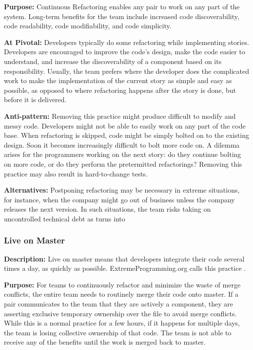 \textbf{Purpose:} Continuous Refactoring enables any pair to work on any part of the system. Long-term benefits for the team include increased code discoverability, code readability, code modifiability, and code simplicity. 

\textbf{At Pivotal:} Developers typically do some refactoring while implementing stories. Developers are encouraged to improve the code's design, make the code easier to understand, and increase the discoverability of a component based on its responsibility. Usually, the team prefers  where the developer does the complicated work to make the implementation of the current story as simple and easy as possible, as opposed to  where refactoring happens after the story is done, but before it is delivered. 

\textbf{Anti-pattern:} Removing this practice might produce difficult to modify and messy code. Developers might not be able to easily work on any part of the code base. When refactoring is skipped, code might be simply bolted on to the existing design. Soon it becomes increasingly difficult to bolt more code on. A dilemma arises for the programmers working on the next story: do they continue bolting on more code, or do they perform the pretermitted refactorings? Removing this practice may also result in hard-to-change tests.

\textbf{Alternatives:} Postponing refactoring may be necessary in extreme situations, for instance, when the company might go out of business unless the company releases the next version. In such situations, the team risks taking on uncontrolled technical debt as  turns into  

\subsubsection{Live on Master}
\textbf{Description:} Live on master means that developers integrate their code several times a day, as quickly as possible. ExtremeProgramming.org calls this practice  \cite{WellsIntegrateOften}.

\textbf{Purpose:} For teams to continuously refactor and minimize the waste of merge conflicts, the entire team needs to routinely merge their code onto master. If a pair communicates to the team that they are actively  a component, they are asserting exclusive temporary ownership over the file to avoid merge conflicts. While this is a normal practice for a few hours, if it happens for multiple days, the team is losing collective ownership of that code. The team is not able to receive any of the benefits until the work is merged back to master. 

